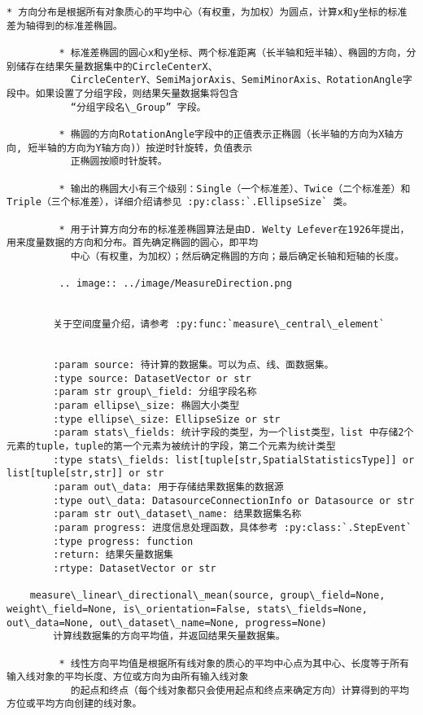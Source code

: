 \documentclass[11pt]{article}
\begin{document}
\begin{Verbatim}[commandchars=\\\{\}]
         * 方向分布是根据所有对象质心的平均中心（有权重，为加权）为圆点，计算x和y坐标的标准差为轴得到的标准差椭圆。
        
         * 标准差椭圆的圆心x和y坐标、两个标准距离（长半轴和短半轴）、椭圆的方向，分别储存在结果矢量数据集中的CircleCenterX、
           CircleCenterY、SemiMajorAxis、SemiMinorAxis、RotationAngle字段中。如果设置了分组字段，则结果矢量数据集将包含
           “分组字段名\_Group” 字段。
        
         * 椭圆的方向RotationAngle字段中的正值表示正椭圆（长半轴的方向为X轴方向, 短半轴的方向为Y轴方向)）按逆时针旋转，负值表示
           正椭圆按顺时针旋转。
        
         * 输出的椭圆大小有三个级别：Single（一个标准差）、Twice（二个标准差）和Triple（三个标准差），详细介绍请参见 :py:class:`.EllipseSize` 类。
        
         * 用于计算方向分布的标准差椭圆算法是由D. Welty Lefever在1926年提出，用来度量数据的方向和分布。首先确定椭圆的圆心，即平均
           中心（有权重，为加权）；然后确定椭圆的方向；最后确定长轴和短轴的长度。
        
         .. image:: ../image/MeasureDirection.png
        
        
        关于空间度量介绍，请参考 :py:func:`measure\_central\_element`
        
        
        :param source: 待计算的数据集。可以为点、线、面数据集。
        :type source: DatasetVector or str
        :param str group\_field: 分组字段名称
        :param ellipse\_size: 椭圆大小类型
        :type ellipse\_size: EllipseSize or str
        :param stats\_fields: 统计字段的类型，为一个list类型，list 中存储2个元素的tuple，tuple的第一个元素为被统计的字段，第二个元素为统计类型
        :type stats\_fields: list[tuple[str,SpatialStatisticsType]] or list[tuple[str,str]] or str
        :param out\_data: 用于存储结果数据集的数据源
        :type out\_data: DatasourceConnectionInfo or Datasource or str
        :param str out\_dataset\_name: 结果数据集名称
        :param progress: 进度信息处理函数，具体参考 :py:class:`.StepEvent`
        :type progress: function
        :return: 结果矢量数据集
        :rtype: DatasetVector or str
    
    measure\_linear\_directional\_mean(source, group\_field=None, weight\_field=None, is\_orientation=False, stats\_fields=None, out\_data=None, out\_dataset\_name=None, progress=None)
        计算线数据集的方向平均值，并返回结果矢量数据集。
        
         * 线性方向平均值是根据所有线对象的质心的平均中心点为其中心、长度等于所有输入线对象的平均长度、方位或方向为由所有输入线对象
           的起点和终点（每个线对象都只会使用起点和终点来确定方向）计算得到的平均方位或平均方向创建的线对象。
        

\end{Verbatim}
\end{document}
